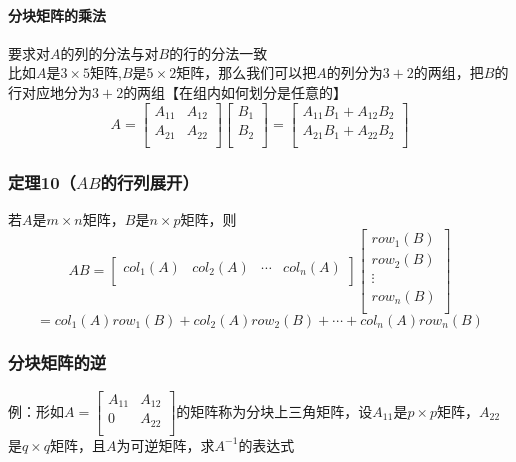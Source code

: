 \documentclass{article}
\begin{document}
\begin{CJK}{UTF8}{gkai}
\paragraph{分块矩阵的乘法\\}
要求对$A$的列的分法与对$B$的行的分法一致\\
比如$A$是$3\times 5$矩阵,$B$是$5\times 2$矩阵，那么我们可以把$A$的列分为$3+2$的两组，把$B$的行对应地分为$3+2$的两组【在组内如何划分是任意的】\\
\[A=
    \begin{bmatrix}
    A_{11}&A_{12}\\
    A_{21}&A_{22}\\
\end{bmatrix}
\begin{bmatrix}
    B_{1}\\
    B_{2}\\
\end{bmatrix}
=
\begin{bmatrix}
    A_{11}B_1+A_{12}B_2\\
    A_{21}B_1+A_{22}B_2\\
\end{bmatrix}\]
\subsubsection{定理10（$AB$的行列展开）}
若$A$是$m\times n$矩阵，$B$是$n\times p$矩阵，则
\[AB=
\begin{bmatrix}
col_1(A)&col_2(A)&\cdots&col_n(A)\\
\end{bmatrix}
\begin{bmatrix}
row_1(B)\\
row_2(B)\\
\vdots \\
row_n(B)\\
\end{bmatrix}\]
\[=col_1(A) row_1(B)+col_2(A) row_2(B)+\cdots +col_n(A) row_n(B)\]
\subsubsection{分块矩阵的逆}
例：形如$A=\begin{bmatrix} A_{11}&A_{12}\\0&A_{22}\\ \end{bmatrix}$的矩阵称为分块上三角矩阵，设$A_{11}$是$p\times p$矩阵，$A_{22}$是$q\times q$矩阵，且$A$为可逆矩阵，求$A^{-1}$的表达式\\


\end{CJK}
\end{document}

